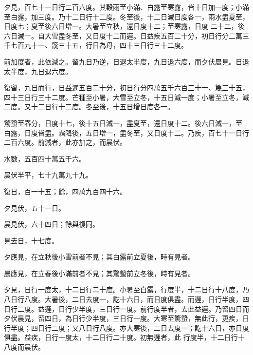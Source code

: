 \begin{pinyinscope}
 夕見，百七十一日行二百六度。其穀雨至小滿、白露至寒露，皆十日加一度；小滿至白露，加三度。乃十二日行十二度。冬至後，十二日減日度各一，雨水盡夏至，日度七；夏至後六日增一。大暑至立秋，還日度十二；至寒露，日度
 二十二，後六日減一。自大雪盡冬至，又日度十二而遲。日益疾五百二十分，初日行分二萬三千七百九十一、篾三十五，行日為母，四十三日行三十二度。



 前加度者，此依減之。留九日乃逆，日退太半度，九日退六度，而夕伏晨見。日退太半度，九日退六度。



 復留，九日而行，日益遲五百二十分，初日行分四萬五千六百三十一、篾三十五，四十三日行三十二度。芒種至小暑，大雪至立冬，十五日減一度；小暑至立冬，減二度。又十二日行十二度。冬至後，十五日增日度各一。



 驚蟄至春分，日度十七，後十五日減一，盡夏至，還日度十二。後六日減一，至
 白露，日度皆盡。霜降後，五日增一，盡冬至，又日度十二。乃疾，百七十一日行二百六度。前減者，此亦加之，而晨伏。



 水數，五百四十萬五千六。



 晨伏半平，七十九萬九十九。



 復日，百一十五；餘，四萬九百四十六。



 夕見伏，五十一日。



 晨見伏，六十四日；餘與復同。



 見去日，十七度。



 夕應見，在立秋後小雪前者不見；其白露前立夏後，時有見者。



 晨應見，在立春後小滿前者不見；其驚蟄前立冬後，時有見者。



 夕見，日行一度太，十二日行二十度。小暑至白露，行度半，十二日行十八度，乃八日行八度。大暑後，二日去度一，訖十六日，而日度俱盡。而遲，日行半度，四日行二度。益遲，日行少半度，三日行一度。前行度半者，去此益遲。乃留四日而夕伏晨見，留四日，為日行少半度，三日行一度。大寒至驚蟄，無此行，更疾，日行半度；四日行二度；又八日行八度。亦大寒後，二日去度一；訖十六日，亦日度俱盡。益疾，日行一度太，十二日行二十度。初無遲者，此
 行度半，十二日行十八度而晨伏。




\end{pinyinscope}
